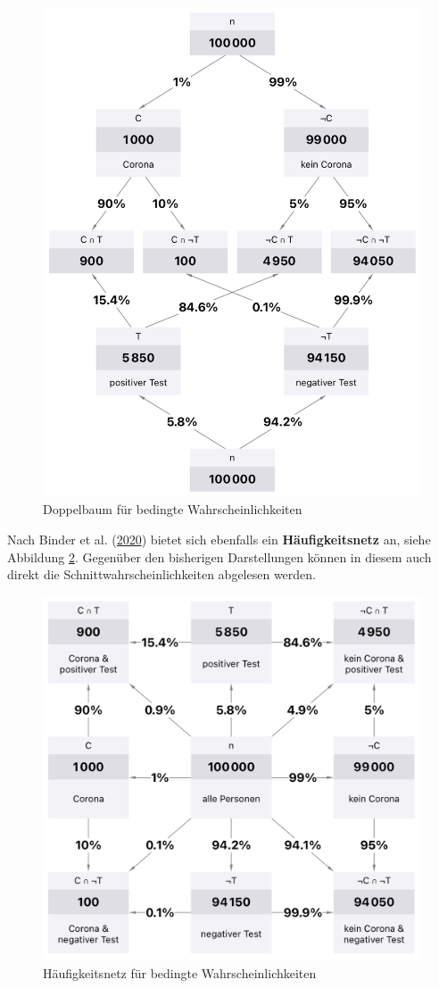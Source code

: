 \documentclass[
]{scrbook}
\theoremstyle{definition}
\theoremstyle{definition}
\theoremstyle{definition}
\theoremstyle{definition}
\theoremstyle{remark}
\begin{document}
\begin{figure}

{\centering \includegraphics[width=0.75\linewidth]{pictures/14-Doppelbaum} 

}

\caption{Doppelbaum für bedingte Wahrscheinlichkeiten}\label{fig:Doppelbaum}
\end{figure}

Nach Binder et al. (\protect\hyperlink{ref-Binder2020}{2020}) bietet sich ebenfalls ein \textbf{Häufigkeitsnetz} an, siehe Abbildung \ref{fig:Netz}. Gegenüber den bisherigen Darstellungen können in diesem auch direkt die Schnittwahrscheinlichkeiten abgelesen werden.

\begin{figure}

{\centering \includegraphics[width=0.75\linewidth]{pictures/14-Netz} 

}

\caption{Häufigkeitsnetz für bedingte Wahrscheinlichkeiten}\label{fig:Netz}
\end{figure}
\end{document}
